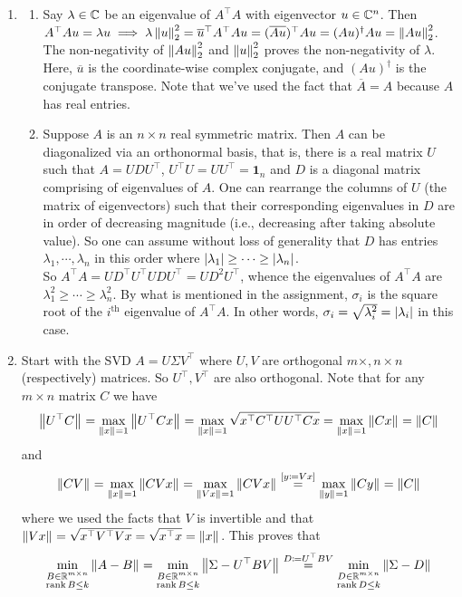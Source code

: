 \begin{enumerate}[leftmargin=*]
\item 
\begin{enumerate}
\item Say $\lambda\in\mathbb{C}$ be an eigenvalue of $A^\top A$ with eigenvector $u\in\mathbb{C}^n$. Then $A^\top Au=\lambda u\implies \lambda \left\lVert u \right\rVert_{2}^2 =\overline{u}^\top A^\top Au = (\overline{Au})^\top Au = (Au)^\dagger Au = \left\lVert Au \right\rVert_{2}^2$. The non-negativity of $\left\lVert Au \right\rVert_{2}^2$ and $\left\lVert u \right\rVert_{2}^2$ proves the non-negativity of $\lambda$. \\
Here, $\overline u$ is the coordinate-wise complex conjugate, and $(Au)^\dagger$ is the conjugate transpose. Note that we've used the fact that $\overline A = A$ because $A$ has real entries.
\item Suppose $A$ is an $n\times n$ real symmetric matrix. Then $A$ can be diagonalized via an orthonormal basis, that is, there is a real matrix $U$ such that $A=UDU^\top$, $U^\top U = UU^\top = \pmb 1_n$ and $D$ is a diagonal matrix comprising of eigenvalues of $A$. One can rearrange the columns of $U$ (the matrix of eigenvectors) such that their corresponding eigenvalues in $D$ are in order of decreasing magnitude (i.e., decreasing after taking absolute value). So one can assume without loss of generality that $D$ has entries $\lambda_1,\cdots,\lambda_n$ in this order where $\left| \lambda_1 \right|\geq \cdots \geq \left| \lambda_n \right|$.\\
So $A^\top A = UD^\top U^\top UDU^\top = UD^2U^\top$, whence the eigenvalues of $A^\top A$ are $\lambda_1^2\geq \cdots\geq \lambda_n^2$. By what is mentioned in the assignment, $\sigma_i$ is the square root of the $i^{\text{th}}$ eigenvalue of $A^\top A$. In other words, $\sigma_i = \sqrt{\lambda_i^2} = \left| \lambda_i \right|$ in this case.
\end{enumerate}
\item Start with the SVD $A=U\Sigma V^\top$ where $U,V$ are orthogonal $m\times, n\times n$ (respectively) matrices. So $U^\top,V^\top$ are also orthogonal. Note that for any $m\times n$ matrix $C$ we have $$\left\lVert U^\top C \right\rVert_{} = \max_{\left\lVert x \right\rVert_{}=1}\left\lVert U^\top Cx \right\rVert_{} = \max_{\left\lVert x \right\rVert_{}=1}\sqrt{x^\top C^\top UU^\top Cx} = \max_{\left\lVert x \right\rVert_{}=1}\left\lVert Cx \right\rVert_{} = \left\lVert C \right\rVert_{}$$
and 
$$\left\lVert CV \right\rVert_{} = \max_{\left\lVert x \right\rVert_{}=1}\left\lVert CVx \right\rVert_{} = \max_{\left\lVert V x \right\rVert_{}=1}\left\lVert CVx \right\rVert_{} \stackrel{[y\coloneqq Vx]}{=} \max_{\left\lVert y \right\rVert_{}=1}\left\lVert Cy \right\rVert_{} = \left\lVert C \right\rVert_{}$$
where we used the facts that $V$ is invertible and that $\left\lVert Vx \right\rVert_{} = \sqrt{x^\top V^\top Vx} = \sqrt{x^\top x} = \left\lVert x \right\rVert_{}$.
This proves that $$\min_{\substack{B\in\mathbb{R}^{m\times n}\\ \operatorname{rank} B\leq k} } \left\lVert A-B \right\rVert_{} = \min_{\substack{B\in\mathbb{R}^{m\times n}\\ \operatorname{rank} B\leq k} } \left\lVert \Sigma-U^\top BV \right\rVert_{} \stackrel{D\coloneqq U^\top BV}{=} \min_{\substack{D\in\mathbb{R}^{m\times n}\\ \operatorname{rank} D\leq k} } \left\lVert \Sigma-D \right\rVert_{}$$

\end{enumerate}
